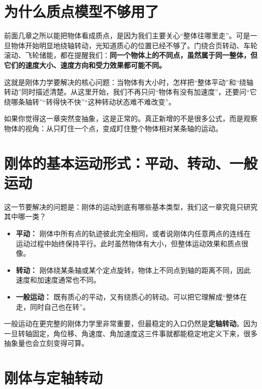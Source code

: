 \documentclass[lang=cn,11pt]{elegantbook}
\begin{document}
\section{为什么质点模型不够用了}

前面几章之所以能把物体看成质点，是因为我们主要关心“整体往哪里走”。可是一旦物体开始明显地绕轴转动，光知道质心的位置已经不够了。门绕合页转动、车轮滚动、飞轮储能，都在提醒我们：\textbf{同一个物体上的不同点，虽然属于同一整体，但它们的速度大小、速度方向和受力效果都可能不同。}

这就是刚体力学要解决的核心问题：当物体有大小时，怎样把“整体平动”和“绕轴转动”同时描述清楚。从这里开始，我们不再只问“物体有没有加速度”，还要问“它绕哪条轴转”“转得快不快”“这种转动状态难不难改变”。

\begin{note}
如果你觉得这一章突然变抽象，这是正常的。真正新增的不是很多公式，而是观察物体的视角：从只盯住一个点，变成盯住整个物体相对某条轴的运动。
\end{note}

\section{刚体的基本运动形式：平动、转动、一般运动}

这一节要解决的问题是：刚体的运动到底有哪些基本类型，我们这一章究竟只研究其中哪一类？

\begin{itemize}
  \item \textbf{平动：} 刚体中所有点的轨迹彼此完全相同，或者说刚体内任意两点的连线在运动过程中始终保持平行。此时虽然物体有大小，但整体运动效果和质点很像。
  \item \textbf{转动：} 刚体绕某条轴或某个定点旋转，物体上不同点到轴的距离不同，因此速度和加速度通常也不同。
  \item \textbf{一般运动：} 既有质心的平动，又有绕质心的转动。可以把它理解成“整体在走，同时自己也在转”。
\end{itemize}

\begin{note}
一般运动在更完整的刚体力学里非常重要，但最稳定的入口仍然是\textbf{定轴转动}。因为一旦转轴固定，角位移、角速度、角加速度这三件事就都能稳定地定义下来，很多抽象量也会立刻变得可算。
\end{note}

\section{刚体与定轴转动}
\end{document}
